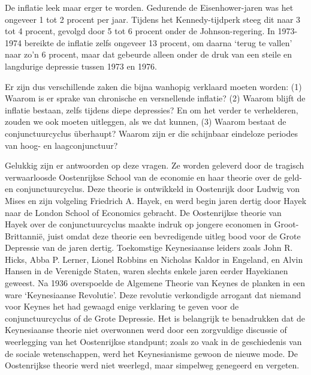 \documentclass[
  a5paper,
  smalldemyvopaper,10pt,twoside,onecolumn,openright,extrafontsizes,hidelinks]{memoir}
\begin{document}
De inflatie leek maar erger te worden. Gedurende de Eisenhower-jaren was
het ongeveer 1 tot 2 procent per jaar. Tijdens het Kennedy-tijdperk
steeg dit naar 3 tot 4 procent, gevolgd door 5 tot 6 procent onder de
Johnson-regering. In 1973-1974 bereikte de inflatie zelfs ongeveer 13
procent, om daarna `terug te vallen' naar zo'n 6 procent, maar dat
gebeurde alleen onder de druk van een steile en langdurige depressie
tussen 1973 en 1976.

Er zijn dus verschillende zaken die bijna wanhopig verklaard moeten
worden: (1) Waarom is er sprake van chronische en versnellende inflatie?
(2) Waarom blijft de inflatie bestaan, zelfs tijdens diepe depressies?
En om het verder te verhelderen, zouden we ook moeten uitleggen, als we
dat kunnen, (3) Waarom bestaat de conjunctuurcyclus überhaupt? Waarom
zijn er die schijnbaar eindeloze periodes van hoog- en laagconjunctuur?

Gelukkig zijn er antwoorden op deze vragen. Ze worden geleverd door de
tragisch verwaarloosde Oostenrijkse School van de economie en haar
theorie over de geld- en conjunctuurcyclus. Deze theorie is ontwikkeld
in Oostenrijk door Ludwig von Mises en zijn volgeling Friedrich A.
Hayek, en werd begin jaren dertig door Hayek naar de London School of
Economics gebracht. De Oostenrijkse theorie van Hayek over de
conjunctuurcyclus maakte indruk op jongere economen in Groot-Brittannië,
juist omdat deze theorie een bevredigende uitleg bood voor de Grote
Depressie van de jaren dertig. Toekomstige Keynesiaanse leiders zoals
John R. Hicks, Abba P. Lerner, Lionel Robbins en Nicholas Kaldor in
Engeland, en Alvin Hansen in de Verenigde Staten, waren slechts enkele
jaren eerder Hayekianen geweest. Na 1936 overspoelde de Algemene Theorie
van Keynes de planken in een ware `Keynesiaanse Revolutie'. Deze
revolutie verkondigde arrogant dat niemand voor Keynes het had gewaagd
enige verklaring te geven voor de conjunctuurcyclus of de Grote
Depressie. Het is belangrijk te benadrukken dat de Keynesiaanse theorie
niet overwonnen werd door een zorgvuldige discussie of weerlegging van
het Oostenrijkse standpunt; zoals zo vaak in de geschiedenis van de
sociale wetenschappen, werd het Keynesianisme gewoon de nieuwe mode. De
Oostenrijkse theorie werd niet weerlegd, maar simpelweg genegeerd en
vergeten.
\end{document}
